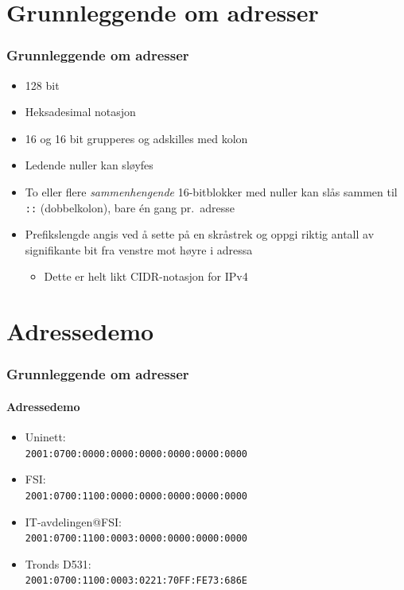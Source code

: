 \section{Grunnleggende om adresser}
\begin{frame}%
  \frametitle{Grunnleggende om adresser}
  \pause
  \begin{itemize}[<+->]
  \item 128 bit
  \item Heksadesimal notasjon
  \item 16 og 16 bit grupperes og adskilles med kolon
  \item Ledende nuller kan sløyfes
  \item To eller flere \textit{sammenhengende\/} 16-bitblokker med
    nuller kan slås sammen til \texttt{::} (dobbelkolon), bare én gang
    pr.\ adresse
  \item Prefikslengde angis ved å sette på en skråstrek og oppgi
    riktig antall av signifikante bit fra venstre mot høyre i adressa
    \begin{itemize}[<+->]
    \item Dette er helt likt CIDR-notasjon for IPv4 
    \end{itemize}
  \end{itemize}
\end{frame}

\section{Adressedemo}
\begin{frame}%
  \frametitle{Grunnleggende om adresser}
  \framesubtitle{Adressedemo}
  \pause
  \begin{itemize}[<+->]
  \item Uninett:\\\texttt{2001:0700:0000:0000:0000:0000:0000:0000\phantom{/32}}
  \item FSI:\\\texttt{2001:0700:1100:0000:0000:0000:0000:0000\phantom{/48}}
  \item IT-avdelingen@FSI:\\\texttt{2001:0700:1100:0003:0000:0000:0000:0000\phantom{/64}}
  \item Tronds D531:\\\texttt{2001:0700:1100:0003:0221:70FF:FE73:686E\phantom{/128}}
  \end{itemize}
\end{frame}


